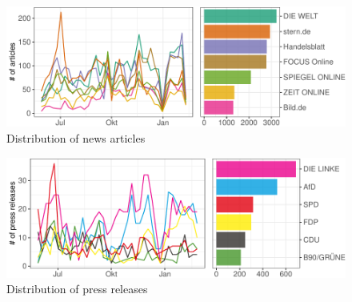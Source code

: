 \documentclass[
  12pt,
]{article}
\begin{document}
\begin{figure}

{\centering \includegraphics[width=0.8\linewidth]{main_text_files/figure-latex/Distribution of news articles-1} 

}

\caption{Distribution of news articles \label{fig:news_distr}}\label{fig:Distribution of news articles}
\end{figure}

\begin{figure}

{\centering \includegraphics[width=0.8\linewidth]{main_text_files/figure-latex/Distribution of press releases-1} 

}

\caption{Distribution of press releases \label{fig:press_distr}}\label{fig:Distribution of press releases}
\end{figure}
\end{document}
